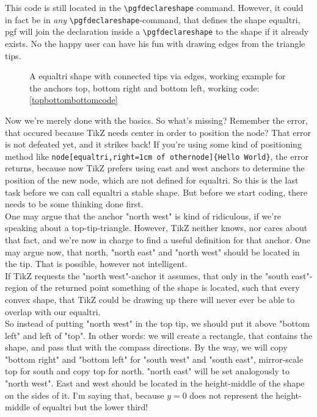 \documentclass[12pt]{article}
\begin{document}
This code is still located in the \lstinline!\pgfdeclareshape! command. However, it could in fact be in \textit{any} \lstinline!\pgfdeclareshape!-command, that defines the shape equaltri, pgf will join the declaration inside a \lstinline!\pgfdeclareshape! to the shape if it already exists. No the happy user can have his fun with drawing edges from the triangle tips.
\begin{figure}[H]
\centering
{}
\caption{A equaltri shape with connected tips via edges, working example for the anchors top, bottom right and bottom left, working code: \autoref{topbottombottomcode}}\label{topbottombottomanchors}
\end{figure}
\noindent Now we're merely done with the basics. So what's missing? Remember the error, that occured because TikZ needs center in order to position the node? That error is not defeated yet, and it strikes back! If you're using some kind of positioning method like \lstinline!node[equaltri,right=1cm of othernode]{Hello World}!, the error returns, because now TikZ prefers using east and west anchors to determine the position of the new node, which are not defined for equaltri. So this is the last task before we can call equaltri a stable shape. But before we start coding, there needs to be some thinking done first.\\
One may argue that the anchor "north west" is kind of ridiculous, if we're speaking about a top-tip-triangle. However, TikZ neither knows, nor cares about that fact, and we're now in charge to find a useful definition for that anchor. One may argue now, that north, "north east" and "north west" should be located in the tip. That is possible, however not intelligent.\\
If TikZ requests the "north west"-anchor it assumes, that only in the "south east"-region of the returned point something of the shape is located, such that every convex shape, that TikZ could be drawing up there will never ever be able to overlap with our equaltri.\\
So instead of putting "north west" in the top tip, we should put it above "bottom left" and left of "top". In other words: we will create a rectangle, that contains the shape, and pass that with the compass directions. By the way, we will copy "bottom right" and "bottom left" for "south west" and "south east", mirror-scale top for south and copy top for north. "north east" will be set analogously to "north west". East and west should be located in the height-middle of the shape on the sides of it. I'm saying that, because $y=0$ does not represent the height-middle of equaltri but the lower third!\\
\end{document}
